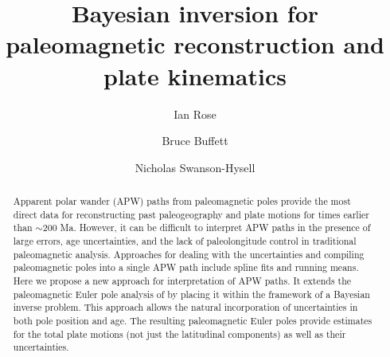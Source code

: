 \documentclass[preprint,12pt,authoryear]{elsarticle}
\begin{document}
\begin{frontmatter}



\title{Bayesian inversion for paleomagnetic reconstruction and plate kinematics}


\author{Ian Rose}
\author{Bruce Buffett}
\author{Nicholas Swanson-Hysell}


\address{}

\begin{abstract}
Apparent polar wander (APW) paths from paleomagnetic poles provide the most direct data
for reconstructing past paleogeography and plate motions for times earlier than $\sim$200 Ma. 
However, it can be difficult to interpret APW paths in the presence of large errors,
age uncertainties, and the lack of paleolongitude control in traditional paleomagnetic analysis.
Approaches for dealing with the uncertainties and compiling paleomagnetic poles 
into a single APW path include spline fits and running means.
Here we propose a new approach for interpretation of APW paths.
It extends the paleomagnetic Euler pole analysis of \citet{gordon1984paleomagnetic}
by placing it within the framework of a Bayesian inverse problem.
This approach allows the natural incorporation of uncertainties in both pole position and age.
The resulting paleomagnetic Euler poles provide estimates for the total
plate motions (not just the latitudinal components) as well as their uncertainties.


\end{abstract}
\end{frontmatter}
\end{document}
